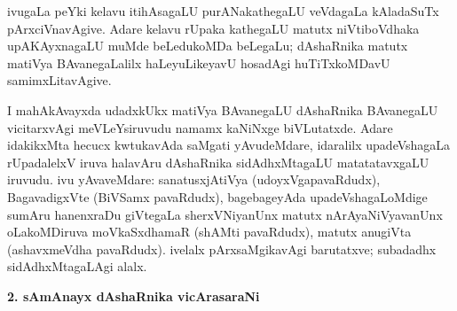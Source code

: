ivugaLa peYki kelavu itihAsagaLU purANakathegaLU veVdagaLa kAladaSuTx pArxciVnavAgive. Adare kelavu rUpaka kathegaLU  matutx niVtiboVdhaka upAKAyxnagaLU muMde beLedukoMDa beLegaLu; dAshaRnika matutx matiVya BAvanegaLalilx haLeyuLikeyavU hosadAgi huTiTxkoMDavU samimxLitavAgive.

I mahAkAvayxda udadxkUkx matiVya BAvanegaLU dAshaRnika BAvanegaLU vicitarx\-vAgi meVLeYsiruvudu namamx kaNiNxge biVLutatxde. Adare idakikxMta hecucx kwtukavAda \hbox{saMgati} yAvudeMdare, idaralilx upadeVshagaLa rUpadalelxV iruva halavAru dAshaRnika sidAdhxMtagaLU matatatavxgaLU iruvudu. ivu yAvaveMdare: sanatusxjAtiVya (udoyxVgapavaRdudx), BagavadigxVte (BiVSamx pavaRdudx), bagebageyAda upadeVsha\-gaLoMdige sumAru hanenxraDu giVtegaLa sherxVNiyanUnx matutx nArAyaNiVyavanUnx oLakoMDiruva moVkaSxdhamaR (shAMti pavaRdudx), matutx anugiVta (ashavxmeVdha pavaRdudx). ivelalx pArxsaMgikavAgi barutatxve; subadadhx sidAdhxMtagaLAgi alalx.

\bigskip
\begin{center}
{\Large\bf 2. sAmAnayx dAshaRnika vicArasaraNi}
\end{center}

